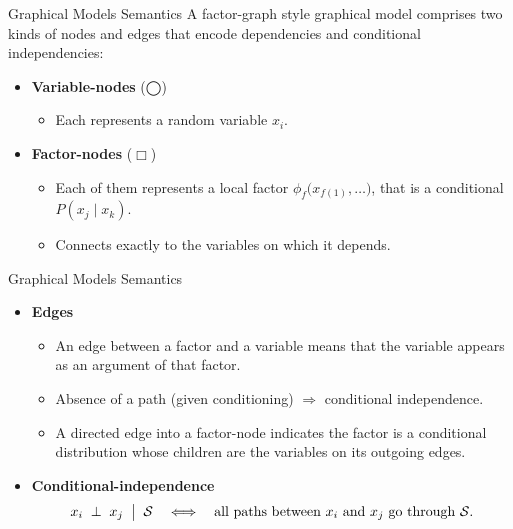 \documentclass[aspectratio=1610, english]{beamer}
\begin{document}
\begin{frame}{Graphical Models Semantics}
  A factor-graph style graphical model comprises two kinds of nodes and edges that encode dependencies and conditional independencies:
  \begin{itemize}
    \item \textbf{Variable-nodes} (◯)  
      \begin{itemize}
        \item Each represents a random variable \(x_i\).
      \end{itemize}
    \item \textbf{Factor-nodes} ($\Box$)
      \begin{itemize}
        \item Each of them represents a local factor \(\phi_f\bigl(x_{f(1)},\dots\bigr)\), that is a conditional \(P(x_j\mid x_k)\).  
        \item Connects exactly to the variables on which it depends.  
      \end{itemize}
  \end{itemize}
\end{frame}

\begin{frame}{Graphical Models Semantics}
    \begin{itemize}
        \item \textbf{Edges}  
      \begin{itemize}
        \item An edge between a factor and a variable means that the variable appears as an argument of that factor.  
        \item Absence of a path (given conditioning) $\Rightarrow$ conditional independence.
        \item A directed edge into a factor-node indicates the factor is a conditional distribution whose children are the variables on its outgoing edges.
      \end{itemize}
    \item \textbf{Conditional-independence}  
      \[
        x_i \;\perp\; x_j 
        \;\bigm|\;
        \mathcal{S}
        \quad\Longleftrightarrow\quad
        \text{all paths between \(x_i\) and \(x_j\) go through }\mathcal{S}.
      \]
    \end{itemize}
\end{frame}
\end{document}
